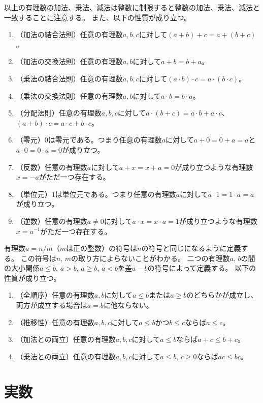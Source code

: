 以上の有理数の加法、乗法、減法は整数に制限すると整数の加法、乗法、減法と一致することに注意する。
また、以下の性質が成り立つ。
\begin{enumerate}
\item
（加法の結合法則）任意の有理数$a, b, c$に対して$(a+b)+c = a+(b+c)$。
\item
（加法の交換法則）任意の有理数$a, b$に対して$a+b = b+a$。
\item
（乗法の結合法則）任意の有理数$a, b, c$に対して$(a\cdot b)\cdot c = a\cdot (b\cdot c)$。
\item
（乗法の交換法則）任意の有理数$a, b$に対して$a\cdot b = b\cdot a$。
\item
（分配法則）任意の有理数$a, b, c$に対して$a\cdot (b+c) = a\cdot b+a\cdot c$、$(a+b)\cdot c = a\cdot c+b\cdot c$。
\item
（零元）$0$は零元である。つまり任意の有理数$a$に対して$a+0 = 0+a = a$と$a\cdot 0 = 0\cdot a = 0$が成り立つ。
\item
（反数）任意の有理数$a$に対して$a+x = x+a = 0$が成り立つような有理数$x = -a$がただ一つ存在する。
\item
（単位元）$1$は単位元である。つまり任意の有理数$a$に対して$a\cdot 1 = 1\cdot a = a$が成り立つ。
\item
（逆数）任意の有理数$a \ne 0$に対して$a\cdot x = x\cdot a = 1$が成り立つような有理数$x = a^{-1}$がただ一つ存在する。
\end{enumerate}

有理数$a = n/m$（$m$は正の整数）の符号は$n$の符号と同じになるように定義する。
この符号は$n$, $m$の取り方によらないことがわかる。
二つの有理数$a$, $b$の間の大小関係$a \le b$, $a > b$, $a \ge b$, $a < b$を差$a-b$の符号によって定義する。
以下の性質が成り立つ。
\begin{enumerate}
\item
（全順序）任意の有理数$a, b$に対して$a \le b$または$a \ge b$のどちらかが成立し、両方が成立する場合は$a = b$に他ならない。
\item
（推移性）任意の有理数$a, b, c$に対して$a \le b$かつ$b \le c$ならば$a \le c$。
\item
（加法との両立）任意の有理数$a, b, c$に対して$a \le b$ならば$a+c \le b+c$。
\item
（乗法との両立）任意の有理数$a, b, c$に対して$a \le b$, $c \ge 0$ならば$a c \le b c$。
\end{enumerate}

\section{実数}


